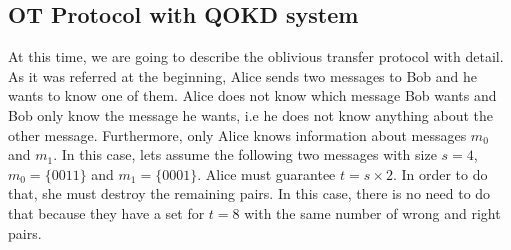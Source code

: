 \subsection{OT Protocol with QOKD system}
    At this time, we are going to describe the oblivious transfer protocol with detail. As it was referred at the beginning, Alice sends two messages to Bob and he wants to know one of them. Alice does not know which message Bob wants and Bob only know the message he wants, i.e he does not know anything about the other message.
    Furthermore, only Alice knows information about messages $m_{0}$ and $m_{1}$.
    In this case, lets assume the following two messages with size $s=4$, $m_{0} = \{0 0 1 1\}$ and $m_{1} = \{0 0 0 1\}$.
    Alice must guarantee $t = s \times 2$. In order to do that, she must destroy the remaining pairs. In this case, there is no need to do that because they have a set for $t=8$ with the same number of wrong and right pairs.

